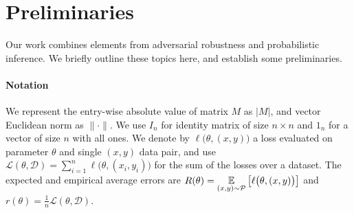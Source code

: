 \section{Preliminaries}
\label{sec:prelim}
Our work combines elements from adversarial robustness and probabilistic inference.
We briefly outline these topics here, and establish some preliminaries.
\paragraph{Notation}
We represent the entry-wise absolute value of matrix $M$ as $|M|$, and vector Euclidean norm as $\| \cdot \|$.
We use $I_n$ for identity matrix of size $n \times n$ %
and $1_n$ for a vector of size $n$ with all ones.
We denote by $\ell\big(\theta, (x,y) \big)$ a loss evaluated on parameter $\theta$ and single $(x,y)$ data pair, and use $\mathcal{L}(\theta, \mathcal{D}) = \sum_{i=1}^n \ell\big(\theta, (x_i,y_i) \big)$ for the sum of the losses over a dataset.
The expected and empirical average errors are $R(\theta)=\underset{(x,y) \sim \mathcal{P}}{\mathbb{E}}\left[\ell\big(\theta, (x,y)\big)\right]$ and $r(\theta)=\frac{1}{n} \mathcal{L}(\theta, \mathcal{D})$.

